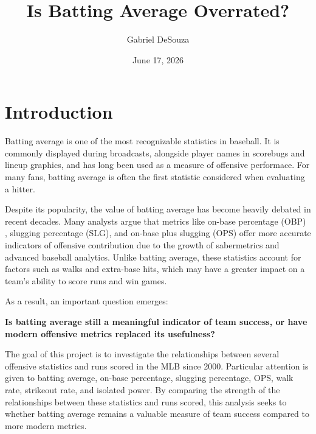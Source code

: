 \documentclass{article}
\title{Is Batting Average Overrated?}
\author{Gabriel DeSouza}
\date{June 17, 2026}
\begin{document}
\maketitle

\tableofcontents
\newpage

\section{Introduction}

\hspace{12pt} Batting average is one of the most recognizable statistics in baseball. It is commonly displayed during broadcasts, alongside player names in 
scorebugs and lineup graphics, and has long been used as a measure of offensive performace. For many fans, batting average is often the first statistic considered 
when evaluating a hitter. 

\vspace{5pt}

Despite its popularity, the value of batting average has become heavily debated in recent decades. Many analysts argue that metrics like on-base percentage (OBP)
, slugging percentage (SLG), and on-base plus slugging (OPS) offer more accurate indicators of offensive contribution due to the growth of sabermetrics and 
advanced baseball analytics. Unlike batting average, these statistics account for factors such as walks and extra-base hits, which may have a greater impact on a team's ability to score runs 
and win games.

\vspace{5pt}

As a result, an important question emerges: 

\vspace{2pt}

\textbf{Is batting average still a meaningful indicator of team success, or have modern offensive metrics replaced its
 usefulness?}

\vspace{5pt}

The goal of this project is to investigate the relationships between several offensive statistics and runs scored in the MLB since 2000. Particular 
attention is given to batting average, on-base percentage, slugging percentage, OPS, walk rate, strikeout rate, and isolated power. By comparing the strength of 
the relationships between these statistics and runs scored, this analysis seeks to whether batting average remains a valuable measure of team success compared to 
more modern metrics.
\end{document}
